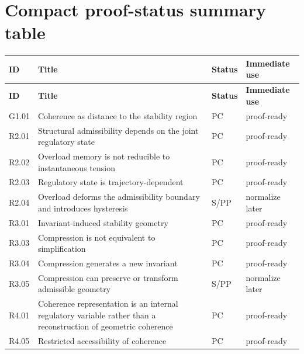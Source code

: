 \documentclass[12pt]{article}
\begin{document}
	\section{Compact proof-status summary table}
	
	\begin{longtable}{>{\RaggedRight\arraybackslash}p{}
			>{\RaggedRight\arraybackslash}p{}
			>{\RaggedRight\arraybackslash}p{}
			>{\RaggedRight\arraybackslash}p{}}
		\toprule
		\textbf{ID} & \textbf{Title} & \textbf{Status} & \textbf{Immediate use} \\
		\midrule
		\endfirsthead
		\toprule
		\textbf{ID} & \textbf{Title} & \textbf{Status} & \textbf{Immediate use} \\
		\midrule
		\endhead
		
		G1.01 & Coherence as distance to the stability region & PC & proof-ready \\
		
		R2.01 & Structural admissibility depends on the joint regulatory state & PC & proof-ready \\
		
		R2.02 & Overload memory is not reducible to instantaneous tension & PC & proof-ready \\
		
		R2.03 & Regulatory state is trajectory-dependent & PC & proof-ready \\
		
		R2.04 & Overload deforms the admissibility boundary and introduces hysteresis & S/PP & normalize later \\
		
		R3.01 & Invariant-induced stability geometry & PC & proof-ready \\
		
		R3.03 & Compression is not equivalent to simplification & PC & proof-ready \\
		
		R3.04 & Compression generates a new invariant & PC & proof-ready \\
		
		R3.05 & Compression can preserve or transform admissible geometry & S/PP & normalize later \\
		
		R4.01 & Coherence representation is an internal regulatory variable rather than a reconstruction of geometric coherence & PC & proof-ready \\
		
		R4.05 & Restricted accessibility of coherence & PC & proof-ready \\
		

\end{longtable}
\end{document}
